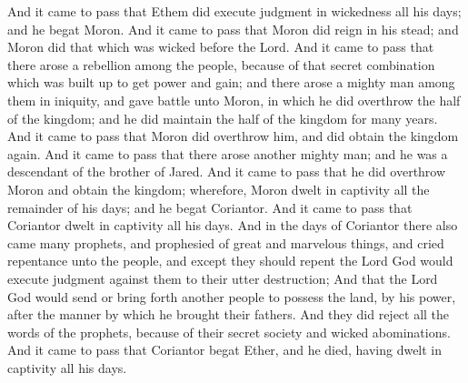 And it came to pass that Ethem did execute judgment in wickedness all his days; and he begat Moron. And it came to pass that Moron did reign in his stead; and Moron did that which was wicked before the Lord.
\bverse \iffalse And it came to pass that there arose a rebellion among the people, because of that secret combination which was built up to get power and gain; and there arose a mighty man among them in iniquity, and gave battle unto Moron, in which he did overthrow the half of the kingdom; and he did maintain the half of the kingdom for many years. \fi
And it came to pass that there arose a rebellion among the people, because of that secret combination which was built up to get power and gain; and there arose a mighty man among them in iniquity, and gave battle unto Moron, in which he did overthrow the half of the kingdom; and he did maintain the half of the kingdom for many years.
\bverse \iffalse And it came to pass that Moron did overthrow him, and did obtain the kingdom again. \fi
And it came to pass that Moron did overthrow him, and did obtain the kingdom again.
\bverse \iffalse And it came to pass that there arose another mighty man; and he was a descendant of the brother of Jared. \fi
And it came to pass that there arose another mighty man; and he was a descendant of the brother of Jared.
\bverse \iffalse And it came to pass that he did overthrow Moron and obtain the kingdom; wherefore, Moron dwelt in captivity all the remainder of his days; and he begat Coriantor. \fi
And it came to pass that he did overthrow Moron and obtain the kingdom; wherefore, Moron dwelt in captivity all the remainder of his days; and he begat Coriantor.
\bverse \iffalse And it came to pass that Coriantor dwelt in captivity all his days. \fi
And it came to pass that Coriantor dwelt in captivity all his days.
\bverse \iffalse And in the days of Coriantor there also came many prophets, and prophesied of great and marvelous things, and cried repentance unto the people, and except they should repent the Lord God would execute judgment against them to their utter destruction; \fi
And in the days of Coriantor there also came many prophets, and prophesied of great and marvelous things, and cried repentance unto the people, and except they should repent the Lord God would execute judgment against them to their utter destruction;
\bverse \iffalse And that the Lord God would send or bring forth another people to possess the land, by his power, after the manner by which he brought their fathers. \fi
And that the Lord God would send or bring forth another people to possess the land, by his power, after the manner by which he brought their fathers.
\bverse \iffalse And they did reject all the words of the prophets, because of their secret society and wicked abominations. \fi
And they did reject all the words of the prophets, because of their secret society and wicked abominations.
\bverse \iffalse And it came to pass that Coriantor begat Ether, and he died, having dwelt in captivity all his days. \fi
And it came to pass that Coriantor begat Ether, and he died, having dwelt in captivity all his days.

